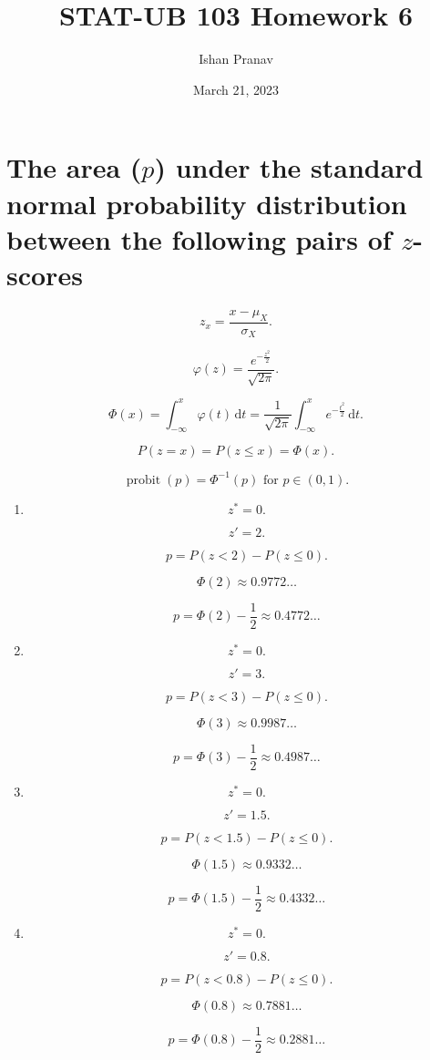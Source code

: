 \documentclass[12pt]{article}
\title{STAT-UB 103 Homework 6}
\author{Ishan Pranav}
\date{March 21, 2023}
\DeclareMathOperator{\probit}{probit}
\begin{document}
\maketitle
\section{The area ($p$) under the standard normal probability distribution between the following pairs of $z$-scores}
\[z_x=\frac{x-\mu_X}{\sigma_X}.\]

\[\varphi(z)=\frac{e^{-\frac{z^2}{2}}}{\sqrt{2\pi}}.\]

\[\Phi(x)=\int^x_{-\infty}{\varphi(t)\,\mathrm{d}t}=\frac{1}{\sqrt{2\pi}}\int^x_{-\infty}{e^{-\frac{t^2}{2}}\,\mathrm{d}t}.\]

\[P(z=x)=P(z\leq x)=\Phi(x).\]

\[\probit(p)=\Phi^{-1}(p)\text{ for } p\in(0,1).\]
\begin{enumerate}
\item
\[z^*=0.\]

\[z'=2.\]

\[p=P(z<2)-P(z\leq 0).\]

\[\Phi(2)\approx 0.9772\dots\]

\[p=\Phi(2)-\frac{1}{2}\approx 0.4772\dots\]
\item
\[z^*=0.\]

\[z'=3.\]

\[p=P(z<3)-P(z\leq 0).\]

\[\Phi(3)\approx 0.9987\dots\]

\[p=\Phi(3)-\frac{1}{2}\approx 0.4987\dots\]
\item
\[z^*=0.\]

\[z'=1.5.\]

\[p=P(z<1.5)-P(z\leq 0).\]

\[\Phi(1.5)\approx 0.9332\dots\]

\[p=\Phi(1.5)-\frac{1}{2}\approx 0.4332\dots\]
\item
\[z^*=0.\]

\[z'=0.8.\]

\[p=P(z<0.8)-P(z\leq 0).\]

\[\Phi(0.8)\approx 0.7881\dots\]

\[p=\Phi(0.8)-\frac{1}{2}\approx 0.2881\dots\]
\end{enumerate}
\end{document}
